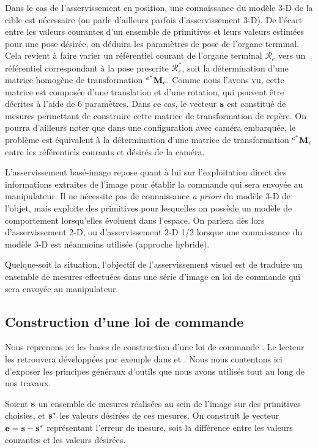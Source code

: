 Dans le cas de l'asservissement en position, une connaissance du modèle 3-D de 
la cible est nécessaire (on parle d'ailleurs parfois d'asservissement 3-D). De 
l'écart entre les valeurs courantes d'un ensemble de primitives et leurs 
valeurs 
estimées pour une pose désirée, on déduira les paramètres de pose de l'organe 
terminal. Cela revient à faire varier un référentiel courant de l'organe 
terminal $\mathcal R_e$ vers un référentiel correspondant à la pose prescrite 
$\mathcal R_e^*$, soit la détermination d'une matrice homogène de 
transformation 
${}^{e^*}{\bf M}_e$. Comme nous l'avons vu, cette matrice est composée d'une 
translation et d'une rotation, qui peuvent être décrites à l'aide de $6$ 
paramètres. Dans ce cas, le vecteur ${\bf s}$ est constitué de mesures 
permettant de construire cette matrice de transformation de repère. On pourra 
d'ailleurs noter que dans une configuration avec caméra embarquée, le problème 
est équivalent à la détermination d'une matrice de transformation ${}^{c^*}{\bf 
M}_c$ entre les référentiels courants et désirés de la caméra.

L'asservissement basé-image repose quant à lui sur l'exploitation direct des 
informations extraites de l'image pour établir la commande qui sera envoyée au 
manipulateur. Il ne nécessite pas de connaissance {\it a priori} du modèle 3-D 
de l'objet, mais exploite des primitives pour lesquelles on possède un modèle 
de 
comportement lorsqu'elles évoluent dans l'espace. On parlera dès lors 
d'asser\-vissement 2-D, ou d'asservissement 2-D 1/2 lorsque une connaissance du 
modèle 3-D est néanmoins utilisée (approche hybride).

Quelque-soit la situation, l'objectif de l'asservissement visuel est de 
traduire 
un ensemble de mesures effectuées dans une série d'image en loi de commande qui 
sera envoyée au manipulateur.

\subsection{Construction d'une loi de commande}\label{chap1-1-2}

Nous reprenons ici les bases de construction d'une loi de commande 
\cite{samson1991}. Le lecteur les retrouvera développées par exemple dans 
\cite{chaumette:tuto01} et \cite{chaumette:tuto02}. Nous nous contentons ici 
d'exposer les principes généraux d'outils que nous avons utilisés tout au long 
de nos travaux.

Soient ${\bf s}$ un ensemble de mesures réalisées au sein de l'image sur des 
primitives choisies, et ${\bf s}^*$ les valeurs désirées de ces mesures. On 
construit le vecteur ${\bf e} = {\bf s} - {\bf s}^*$ représentant l'erreur de 
mesure, soit la différence entre les valeurs courantes et les valeurs désirées.

